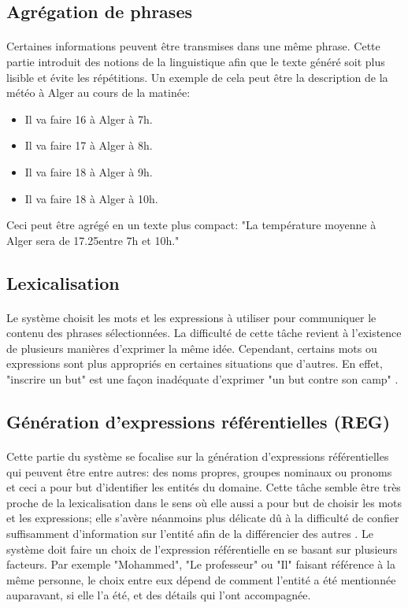 \subsection{Agrégation de phrases}
\paragraph{}
Certaines informations peuvent être transmises dans une même phrase. Cette partie introduit des notions de la linguistique afin que le texte généré soit plus lisible et évite les répétitions. Un exemple de cela peut être la description de la météo à Alger au cours de la matinée:
\begin{itemize}
	\item Il va faire 16\textdegree{} à Alger à 7h.
	\item Il va faire 17\textdegree{} à Alger à 8h.
	\item Il va faire 18\textdegree{} à Alger à 9h.
	\item Il va faire 18\textdegree{} à Alger à 10h.
\end{itemize}
Ceci peut être agrégé en un texte plus compact: "La température moyenne à Alger sera de 17.25\textdegree entre 7h et 10h."

\subsection{Lexicalisation}
\paragraph{}Le système choisit les mots et les expressions à utiliser pour communiquer le contenu des phrases sélectionnées. La difficulté de cette tâche revient à l'existence de plusieurs manières d'exprimer la même idée. Cependant, certains mots ou expressions sont plus appropriés en certaines situations que d'autres. En effet, "inscrire un but" est une façon inadéquate d'exprimer "un but contre son camp" \citep{Gatt2018}.

\subsection{Génération d'expressions référentielles (REG)}
\paragraph{}Cette partie du système se focalise sur la génération d'expressions référentielles qui peuvent être entre autres: des noms propres, groupes nominaux ou pronoms et ceci a pour but d'identifier les entités du domaine. Cette tâche semble être très proche de la lexicalisation dans le sens où elle aussi a pour but de choisir les mots et les expressions; elle s'avère néanmoins plus délicate dû à la difficulté de confier suffisamment d'information sur l'entité afin de la différencier des autres \citep{Reiter:1997}. Le système doit faire un choix de l'expression référentielle en se basant sur plusieurs facteurs. Par exemple "Mohammed", "Le professeur" ou "Il" faisant référence à la même personne, le choix entre eux dépend de comment l'entité a été mentionnée auparavant, si elle l'a été, et des détails qui l'ont accompagnée. 

